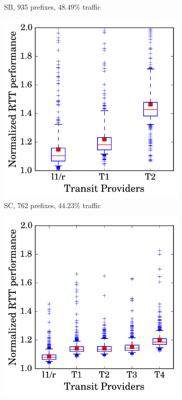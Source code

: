 \begin{figure}
\begin{subfigure}[b]{0.48\textwidth}
                \caption{SB, 935 prefixes, $48.49\%$ traffic}
                \label{fig:np_sb}
        \end{subfigure}
        \begin{subfigure}[b]{0.48\textwidth}
                \includegraphics[width=\textwidth]{gfx/chap2/np_box_sc.png}
                \caption{SC, 762 prefixes, $44.23\%$ traffic}
                \label{fig:np_sc}
        \end{subfigure}
        \begin{subfigure}[b]{0.48\textwidth}
                \includegraphics[width=\textwidth]{gfx/chap2/np_box_sd.png}

\end{subfigure}
\end{figure}
